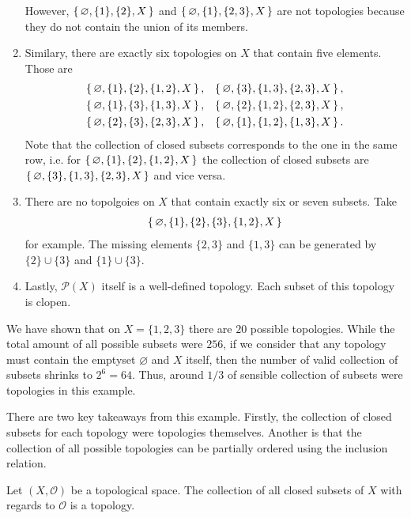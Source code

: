 \begin{example}
\begin{enumerate}
        However, \(\left\{\, \varnothing, \{1\}, \{2\}, X \,\right\}\) and \(\left\{\, \varnothing, \{1\}, \{2, 3\}, X \,\right\}\) are not topologies because they do not contain the union of its members.
        \item Similary, there are exactly six topologies on \(X\) that contain five elements. Those are
        \begin{align*}
            \left\{\, \varnothing, \{1\}, \{2\}, \{1, 2\}, X \,\right\}, & & \left\{\, \varnothing, \{3\}, \{1, 3\}, \{2, 3\}, X \,\right\}, \\
            \left\{\, \varnothing, \{1\}, \{3\}, \{1, 3\}, X \,\right\}, & & \left\{\, \varnothing, \{2\}, \{1, 2\}, \{2, 3\}, X \,\right\}, \\
            \left\{\, \varnothing, \{2\}, \{3\}, \{2, 3\}, X \,\right\}, & & \left\{\, \varnothing, \{1\}, \{1, 2\}, \{1, 3\}, X \,\right\} \text{.}
        \end{align*}
        Note that the collection of closed subsets corresponds to the one in the same row, i.e. for \(\left\{\, \varnothing, \{1\}, \{2\}, \{1, 2\}, X \,\right\}\) the collection of closed subsets are \(\left\{\, \varnothing, \{3\}, \{1, 3\}, \{2, 3\}, X \,\right\}\) and vice versa.
        \item There are no topolgoies on \(X\) that contain exactly six or seven subsets. Take
        \begin{align*}
            \left\{\, \varnothing, \{1\}, \{2\}, \{3\}, \{1, 2\}, X \,\right\}
        \end{align*}
        for example. The missing elements \(\{2, 3\}\) and \(\{1, 3\}\) can be generated by \(\{2\} \cup \{3\}\) and \(\{1\} \cup \{3\}\).
        \item Lastly, \(\mathcal{P}(X)\) itself is a well-defined topology. Each subset of this topology is clopen.
    \end{enumerate}
    We have shown that on \(X = \{1, 2, 3\}\) there are \(20\) possible topologies. While the total amount of all possible subsets were \(256\), if we consider that any topology must contain the emptyset \(\varnothing\) and \(X\) itself, then the number of valid collection of subsets shrinks to \(2^6 = 64\). Thus, around \(1/3\) of sensible collection of subsets were topologies in this example.
\end{example}
There are two key takeaways from this example. Firstly, the collection of closed subsets for each topology were topologies themselves. Another is that the collection of all possible topologies can be partially ordered using the inclusion relation.
%
\begin{thmbox}
    \begin{proposition}
        Let \((X, \mathcal{O})\) be a topological space. The collection of all closed subsets of \(X\) with regards to \(\mathcal{O}\) is a topology.
    \end{proposition}
\end{thmbox}
